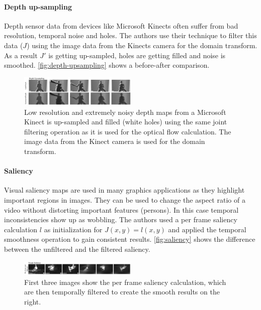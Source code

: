 \paragraph{Depth up-sampling} \label{up-sampling}
Depth sensor data from devices like Microsoft Kinects often suffer from bad
resolution, temporal noise and holes. The authors use their technique to filter
this data ($J$) using the image data from the Kinects camera for the domain
transform. As a result $J'$ is getting up-sampled, holes are getting filled and
noise is smoothed. \autoref{fig:depth-upsampling} shows a before-after
comparison.
\begin{figure}[htb]
  \centering
  \includegraphics[width=0.5\textwidth]{images/depth.png}
  \caption{Low resolution and extremely noisy depth maps from a Microsoft Kinect
  is up-sampled and filled (white holes) using the same joint filtering
operation as it is used for the optical flow calculation. The image data from
the Kinect camera is used for the domain transform.}
  \label{fig:depth-upsampling}
\end{figure}

\paragraph{Saliency} \label{saliency}
Visual saliency maps are used in many graphics applications as they highlight
important regions in images. They can be used to change the aspect ratio of a
video without distorting important features (persons). In this case temporal
inconsistencies show up as wobbling. The authors used a per frame saliency
calculation $l$ as initialization for $J(x,y) = l(x,y)$ and applied the temporal
smoothness operation to gain consistent results. \autoref{fig:saliency} shows
the difference between the unfiltered and the filtered saliency.
\begin{figure}[htb]
  \centering
  \includegraphics[width=0.5\textwidth]{images/saliency.png}
  \caption{First three images show the per frame saliency calculation, which are
  then temporally filtered to create the smooth results on the right.}
  \label{fig:saliency}
\end{figure}

